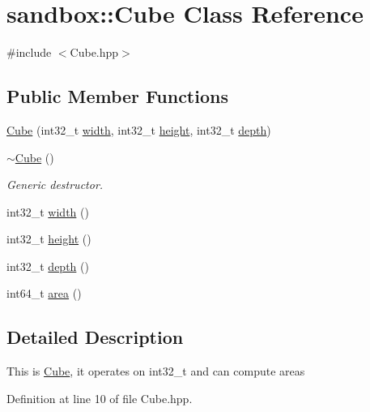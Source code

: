 \hypertarget{classsandbox_1_1_cube}{}\section{sandbox\+::Cube Class Reference}
\label{classsandbox_1_1_cube}


{\ttfamily \#include $<$Cube.\+hpp$>$}

\subsection*{Public Member Functions}
\begin{DoxyCompactItemize}
\item 
\mbox{\hyperlink{classsandbox_1_1_cube_ae1f0c16a3e94b652614ada925b24e611}{Cube}} (int32\+\_\+t \mbox{\hyperlink{classsandbox_1_1_cube_aa485ef5e5e082183f1d9b8565365dfb5}{width}}, int32\+\_\+t \mbox{\hyperlink{classsandbox_1_1_cube_a4b82fdc43ad08573526420833a90a4d4}{height}}, int32\+\_\+t \mbox{\hyperlink{classsandbox_1_1_cube_aeb27ca34752f1cf66d4d8b38a4874f7c}{depth}})
\item 
\mbox{\hyperlink{classsandbox_1_1_cube_ab19e922d0fa9431220eca845ae76e707}{$\sim$\+Cube}} ()
\begin{DoxyCompactList}\small\item\em Generic destructor. \end{DoxyCompactList}\item 
int32\+\_\+t \mbox{\hyperlink{classsandbox_1_1_cube_aa485ef5e5e082183f1d9b8565365dfb5}{width}} ()
\item 
int32\+\_\+t \mbox{\hyperlink{classsandbox_1_1_cube_a4b82fdc43ad08573526420833a90a4d4}{height}} ()
\item 
int32\+\_\+t \mbox{\hyperlink{classsandbox_1_1_cube_aeb27ca34752f1cf66d4d8b38a4874f7c}{depth}} ()
\item 
int64\+\_\+t \mbox{\hyperlink{classsandbox_1_1_cube_a882672645dbe516f24f8c363730fdef0}{area}} ()
\end{DoxyCompactItemize}


\subsection{Detailed Description}
This is \mbox{\hyperlink{classsandbox_1_1_cube}{Cube}}, it operates on int32\+\_\+t and can compute areas 

Definition at line 10 of file Cube.\+hpp.



